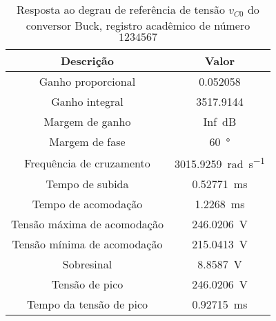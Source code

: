 \begin{table}[!ht]
\centering
\caption{Resposta ao degrau de referência de tensão $v_{C0}$ do conversor Buck, registro acadêmico de número $1234567$}
\label{tab:resposta1malha}
\begin{tabular}{@{}cc@{}}
\toprule
\textbf{Descrição} & \textbf{Valor}\\ \midrule
Ganho proporcional & \SI{0.052058}{}\\
Ganho integral & \SI{3517.9144}{}\\
Margem de ganho & \SI{Inf}{\deci\bel}\\
Margem de fase & \SI{60}{\degree}\\
Frequência de cruzamento & \SI{3015.9259}{\radian\per\s}\\
Tempo de subida & \SI{0.52771}{\milli\s}\\
Tempo de acomodação & \SI{1.2268}{\milli\s}\\
Tensão máxima de acomodação & \SI{246.0206}{\V}\\
Tensão mínima de acomodação & \SI{215.0413}{\V}\\
Sobresinal & \SI{8.8587}{\V}\\
Tensão de pico & \SI{246.0206}{\V}\\
Tempo da tensão de pico & \SI{0.92715}{\milli\s}\\
\bottomrule
\end{tabular}
\end{table}


